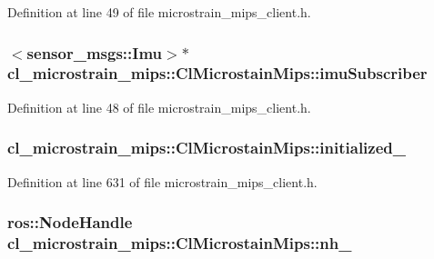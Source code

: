 Definition at line 49 of file microstrain\+\_\+mips\+\_\+client.\+h.

\subsubsection[{\texorpdfstring{imu\+Subscriber}{imuSubscriber}}]{$<$sensor\+\_\+msgs\+::\+Imu$>$$\ast$ cl\+\_\+microstrain\+\_\+mips\+::\+Cl\+Microstain\+Mips\+::imu\+Subscriber}\hypertarget{classcl__microstrain__mips_1_1ClMicrostainMips_a71648a9d970672d017c90bd3724b1104}{}\label{classcl__microstrain__mips_1_1ClMicrostainMips_a71648a9d970672d017c90bd3724b1104}


Definition at line 48 of file microstrain\+\_\+mips\+\_\+client.\+h.

\subsubsection[{\texorpdfstring{initialized\+\_\+}{initialized_}}]{ cl\+\_\+microstrain\+\_\+mips\+::\+Cl\+Microstain\+Mips\+::initialized\+\_\+\hspace{0.3cm}{\ttfamily [protected]}}\hypertarget{classcl__microstrain__mips_1_1ClMicrostainMips_ac57a43d359bfadaf897b51a57ccb3dc8}{}\label{classcl__microstrain__mips_1_1ClMicrostainMips_ac57a43d359bfadaf897b51a57ccb3dc8}


Definition at line 631 of file microstrain\+\_\+mips\+\_\+client.\+h.

\subsubsection[{\texorpdfstring{nh\+\_\+}{nh_}}]{\setlength{\rightskip}{0pt plus 5cm}ros\+::\+Node\+Handle cl\+\_\+microstrain\+\_\+mips\+::\+Cl\+Microstain\+Mips\+::nh\+\_\+\hspace{0.3cm}{\ttfamily [protected]}}\hypertarget{classcl__microstrain__mips_1_1ClMicrostainMips_a5a39ba0864ba2c4c003b6ea427538243}{}\label{classcl__microstrain__mips_1_1ClMicrostainMips_a5a39ba0864ba2c4c003b6ea427538243}


